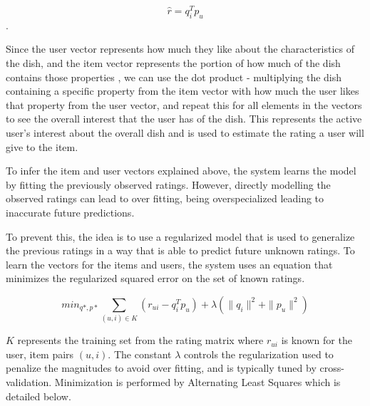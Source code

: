 \begin{equation}\label{eq:1}\tag{1} \widehat{r} = q_{i}^T p_{u} \end{equation}.


Since the user vector represents how much they like about the characteristics of the dish, and the item vector represents the portion of how much of the dish contains those properties \cite{koren2009matrix}, we can use the dot product - multiplying the dish containing a specific property from the item vector with how much the user likes that property from the user vector, and repeat this for all elements in the vectors to see the overall interest that the user has of the dish. This represents the active user's interest about the overall dish and is used to estimate the rating a user will give to the item. 


To infer the item and user vectors explained above, the system learns the model by fitting the previously observed ratings. However, directly modelling the observed ratings can lead to over fitting, being overspecialized leading to inaccurate future predictions.

To prevent this, the idea is to use a regularized model that is used to generalize the previous ratings in a way that is able to predict future unknown ratings. To learn the vectors for the items and users, the system uses an equation that minimizes the regularized squared error on the set of known ratings.

\begin{equation}\label{eq:2}\tag{2}
\displaystyle min_{q*,p*} \sum_{ (u,i) \in K} (r_{ui} - q_{i}^T p_{u}) + \lambda (\| q_{i} \|^2 + \| p_{u} \|^2 )
\end{equation}

\begin{math} K \end{math} represents the training set from the rating matrix where \begin{math} r_{ui} \end{math} is known for the user, item pairs \begin{math} (u,i) \end{math}. The constant \begin{math}\lambda\end{math} controls the regularization used to penalize the magnitudes to avoid over fitting, and is typically tuned by cross-validation. Minimization is performed by Alternating Least Squares \cite{koren2011}  which is detailed below. 

